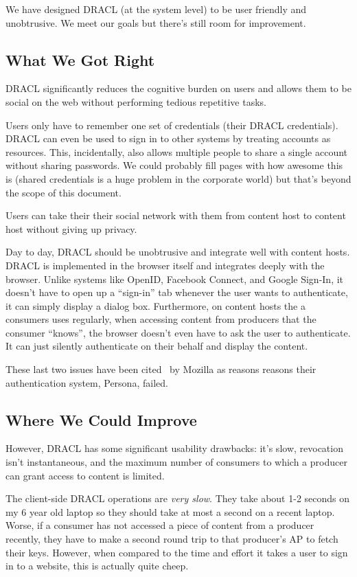 \documentclass[pdftex,12pt,a4papaer,twoside,notitlepage]{report}
\begin{document}
We have designed DRACL (at the system level) to be user friendly and
unobtrusive. We meet our goals but there's still room for improvement.

\subsection{What We Got Right}

DRACL significantly reduces the cognitive burden on users and allows them to be
social on the web without performing tedious repetitive tasks.

Users only have to remember one set of credentials (their DRACL credentials).
DRACL can even be used to sign in to other systems by treating accounts as
resources. This, incidentally, also allows multiple people to share a single
account without sharing passwords. We could probably fill pages with how awesome
this is (shared credentials is a huge problem in the corporate world) but that's
beyond the scope of this document.

Users can take their their social network with them from content host to content
host without giving up privacy.

Day to day, DRACL should be unobtrusive and integrate well with content hosts.
DRACL is implemented in the browser itself and integrates deeply with the
browser. Unlike systems like OpenID, Facebook Connect, and Google Sign-In, it
doesn't have to open up a ``sign-in'' tab whenever the user wants to
authenticate, it can simply display a dialog box. Furthermore, on content hosts
the a consumers uses regularly, when accessing content from producers that the
consumer ``knows'', the browser doesn't even have to ask the user to
authenticate. It can just silently authenticate on their behalf and display the
content.

These last two issues have been cited~\cite{persona-fail} by Mozilla as reasons
reasons their authentication system, Persona, failed.

\subsection{Where We Could Improve}
\label{sub:usability_improve}

However, DRACL has some significant usability drawbacks: it's slow, revocation
isn't instantaneous, and the maximum number of consumers to which a producer can
grant access to content is limited.

The client-side DRACL operations are \emph{very slow}. They take about 1-2
seconds on my 6 year old laptop so they should take at most a second on a recent
laptop. Worse, if a consumer has not accessed a piece of content from a producer
recently, they have to make a second round trip to that producer's AP to fetch
their keys. However, when compared to the time and effort it takes a user to
sign in to a website, this is actually quite cheep.
\end{document}
